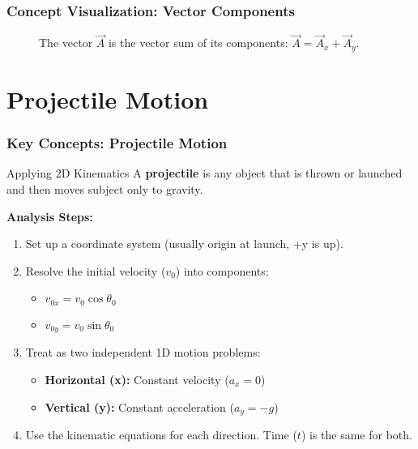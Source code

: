 \documentclass{beamer}
\begin{document}
\begin{frame}
\frametitle{Concept Visualization: Vector Components}
\begin{figure}
\caption{The vector $\vec{A}$ is the vector sum of its components: $\vec{A} = \vec{A}_x + \vec{A}_y$.}
\end{figure}
\end{frame}

\section{Projectile Motion}

\begin{frame}
\frametitle{Key Concepts: Projectile Motion}
\begin{block}{Applying 2D Kinematics}
A \textbf{projectile} is any object that is thrown or launched and then moves subject only to gravity.
\end{block}
\textbf{Analysis Steps:}
\begin{enumerate}
    \item Set up a coordinate system (usually origin at launch, +y is up).
    \item Resolve the initial velocity ($v_0$) into components:
    \begin{itemize}
        \item $v_{0x} = v_0 \cos \theta_0$
        \item $v_{0y} = v_0 \sin \theta_0$
    \end{itemize}
    \item Treat as two independent 1D motion problems:
    \begin{itemize}
        \item \textbf{Horizontal (x):} Constant velocity ($a_x = 0$)
        \item \textbf{Vertical (y):} Constant acceleration ($a_y = -g$)
    \end{itemize}
    \item Use the kinematic equations for each direction. Time ($t$) is the same for both.
\end{enumerate}
\end{frame}
\end{document}
